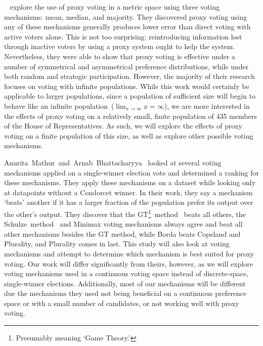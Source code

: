 ~\cite{Cohensius2017} explore the use of proxy voting in a metric space
using three voting mechanisms: mean, median, and majority.
They discovered proxy voting using any of these mechanisms generally produces lower
error than direct voting with active voters alone.
This is not too surprising: reintroducing information lost through inactive voters by
using a proxy system ought to help the system.
Nevertheless, they were able to show that proxy voting is effective under a number of
symmetrical and asymmetrical preference distributions, while under both random and
strategic participation.
However, the majority of their research focuses on voting with infinite populations.
While this work would certainly be applicable to larger populations, since a
population of sufficient size will begin to behave like an infinite
population~($\lim_{x \rightarrow \infty} x = \infty$), we are more interested in the
effects of proxy voting on a relatively small, finite population of 435 members of the
House of Representatives.
As such, we will explore the effects of proxy voting on a finite population of this
size, as well as explore other possible voting mechanisms.

Anurita~Mathur~and~Arnab~Bhattacharyya~\cite{Mathur2017} looked at several voting
mechanisms applied on a single-winner election vote and determined a ranking for
these mechanisms.
They apply these mechanisms on a dataset while looking only at datapoints without a
Condorcet winner.
In their work, they say a mechanism `beats' another if it has a larger fraction of
the population prefer its output over the other's output.
They discover that the GT\footnote{
    Presumably meaning `Game Theory.'
}~method~\cite{Rivest2010} beats all others, the Schulze~method~\cite{Schulze2011}
and Minimax voting mechanisms always agree and beat all other mechanisms besides the
GT method, while Borda beats Copeland and Plurality, and Plurality comes in last.
This study will also look at voting mechanisms and attempt to determine which
mechanism is best suited for proxy voting.
Our work will differ significantly from theirs, however, as we will explore voting
mechanisms used in a continuous voting space instead of discrete-space, single-winner
elections.
Additionally, most of our mechanisms will be different due the mechanisms they used
not being beneficial on a continuous preference space or with a small number of
candidates, or not working well with proxy voting.

